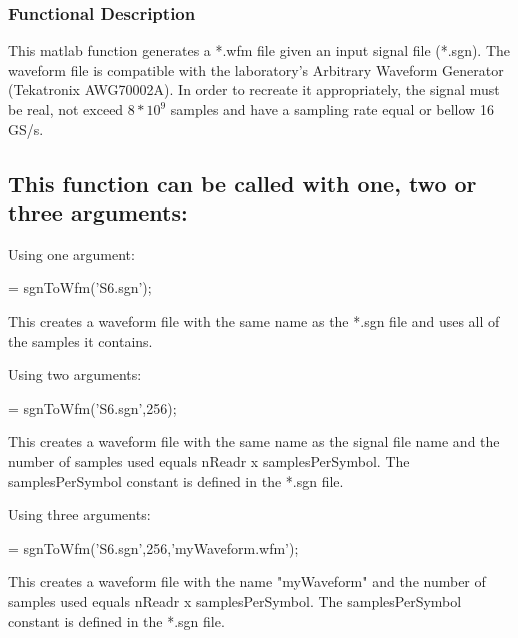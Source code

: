 \subsubsection*{Functional Description}

This matlab function generates a *.wfm file given an input signal file (*.sgn). The waveform file is compatible with the laboratory's Arbitrary Waveform Generator (Tekatronix AWG70002A). In order to recreate it appropriately, the signal must be real, not exceed $8*10^9$ samples and have a sampling rate equal or bellow 16 GS/s.


\subsection*{This function can be called with one, two or three arguments:}
Using one argument:

\bigskip

 = sgnToWfm('S6.sgn');
\bigskip

\noindent
This creates a waveform file with the same name as the *.sgn file and uses all of the samples it contains.
\bigskip

\noindent
Using two arguments:

\bigskip

 = sgnToWfm('S6.sgn',256);
\bigskip

\noindent
This creates a waveform file with the same name as the signal file name and the number of samples used equals nReadr x samplesPerSymbol. The samplesPerSymbol constant is defined in the *.sgn file.
\bigskip

\noindent
Using three arguments:

\bigskip

 = sgnToWfm('S6.sgn',256,'myWaveform.wfm');
\bigskip

\noindent
This creates a waveform file with the name "myWaveform" and the number of samples used equals nReadr x samplesPerSymbol. The samplesPerSymbol constant is defined in the *.sgn file.

